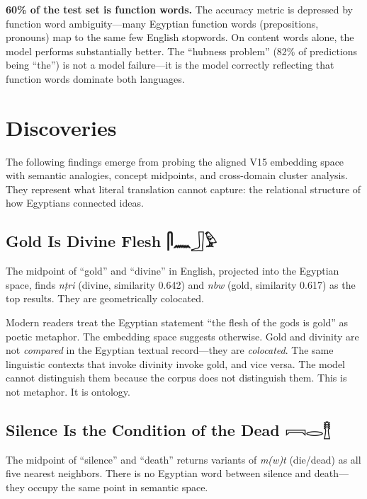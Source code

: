 \documentclass[11pt, a4paper]{article}
\newcommand{\hiero}[1]{{\normalfont\hierofont #1}}
\begin{document}
\textbf{60\% of the test set is function words.} The accuracy metric is depressed by function word ambiguity---many Egyptian function words (prepositions, pronouns) map to the same few English stopwords. On content words alone, the model performs substantially better. The ``hubness problem'' (82\% of predictions being ``the'') is not a model failure---it is the model correctly reflecting that function words dominate both languages.

\section{Discoveries}
\label{sec:discoveries}

The following findings emerge from probing the aligned V15 embedding space with semantic analogies, concept midpoints, and cross-domain cluster analysis. They represent what literal translation cannot capture: the relational structure of how Egyptians connected ideas.

\subsection{Gold Is Divine Flesh \hfill \hiero{𓋴𓈖𓃀𓅱}}

The midpoint of ``gold'' and ``divine'' in English, projected into the Egyptian space, finds \textit{n\d{t}ri} (divine, similarity 0.642) and \textit{nbw} (gold, similarity 0.617) as the top results. They are geometrically colocated.

Modern readers treat the Egyptian statement ``the flesh of the gods is gold'' as poetic metaphor. The embedding space suggests otherwise. Gold and divinity are not \textit{compared} in the Egyptian textual record---they are \textit{colocated}. The same linguistic contexts that invoke divinity invoke gold, and vice versa. The model cannot distinguish them because the corpus does not distinguish them. This is not metaphor. It is ontology.

\subsection{Silence Is the Condition of the Dead \hfill \hiero{𓇯𓂋𓊽}}

The midpoint of ``silence'' and ``death'' returns variants of \textit{m(w)t} (die/dead) as all five nearest neighbors. There is no Egyptian word between silence and death---they occupy the same point in semantic space.
\end{document}
